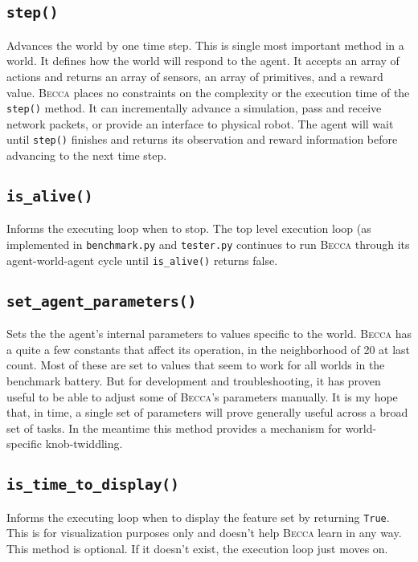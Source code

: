 \subsection{\texttt{step()}}
Advances the world by one time step. This is single most important method in a world. It defines how the world will respond to the agent. It accepts an array of actions and returns an array of sensors, an array of primitives, and a reward value. \textsc{Becca} places no constraints on the complexity or the execution time of the \texttt{step()} method. It can incrementally advance a simulation, pass and receive network packets, or provide an interface to physical robot. The agent will wait until \texttt{step()} finishes and returns its observation and reward information before advancing to the next time step.

\subsection{\texttt{is\_alive()}}
Informs the executing loop when to stop. The top level execution loop (as implemented in \texttt{benchmark.py} and \texttt{tester.py} continues to run \textsc{Becca} through its agent-world-agent cycle until \texttt{is\_alive()} returns false.

\subsection{\texttt{set\_agent\_parameters()}}
Sets the the agent's internal parameters to values specific to the world. \textsc{Becca} has a quite a few constants that affect its operation, in the neighborhood of 20 at last count. Most of these are set to values that seem to work for all worlds in the benchmark battery. But for development and troubleshooting, it has proven useful to be able to adjust some of \textsc{Becca}'s parameters manually. It is my hope that, in time, a single set of parameters will prove generally useful across a broad set of tasks. In the meantime this method provides a mechanism for world-specific knob-twiddling.

\subsection{\texttt{is\_time\_to\_display()}}
Informs the executing loop when to display the feature set by returning \texttt{True}. This is for visualization purposes only and doesn't help \textsc{Becca} learn in any way. This method is optional. If it doesn't exist, the execution loop just moves on.

